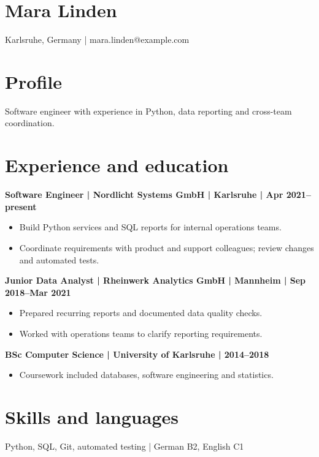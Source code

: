\documentclass[11pt,a4paper]{article}
\begin{document}
\section*{Mara Linden}
Karlsruhe, Germany | mara.linden@example.com\par
\section*{Profile}
Software engineer with experience in Python, data reporting and cross-team coordination.\par
\section*{Experience and education}
\textbf{Software Engineer | Nordlicht Systems GmbH | Karlsruhe | Apr 2021--present}\par
\begin{itemize}
\item Build Python services and SQL reports for internal operations teams.
\item Coordinate requirements with product and support colleagues; review changes and automated tests.
\end{itemize}
\textbf{Junior Data Analyst | Rheinwerk Analytics GmbH | Mannheim | Sep 2018--Mar 2021}\par
\begin{itemize}
\item Prepared recurring reports and documented data quality checks.
\item Worked with operations teams to clarify reporting requirements.
\end{itemize}
\textbf{BSc Computer Science | University of Karlsruhe | 2014--2018}\par
\begin{itemize}
\item Coursework included databases, software engineering and statistics.
\end{itemize}
\section*{Skills and languages}
Python, SQL, Git, automated testing | German B2, English C1\par
\end{document}
